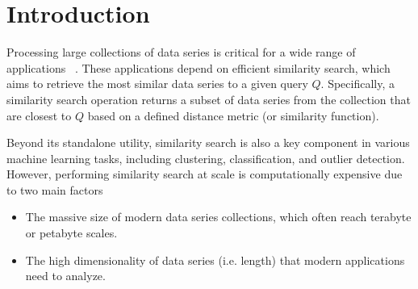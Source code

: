 \documentclass[a4paper,11pt,twoside,openany]{book}
\begin{document}
\chapter{Introduction}
\label{chapter:introduction}


Processing large collections of data series is critical for a wide range of applications
~\cite{DBLP:journals/sigmod/Palpanas15,DBLP:journals/dagstuhl-reports/BagnallCPZ19,Palpanas2019}.
These applications depend on efficient similarity search, which aims to retrieve the most similar
data series to a given query $Q$.
Specifically, a similarity search operation returns a subset of data series from the collection 
that are closest to $Q$  based on a defined distance metric (or similarity function).

Beyond its standalone utility, similarity search is also a key component in various machine 
learning tasks, including clustering, classification, and outlier detection. However, 
performing similarity search at scale is computationally expensive due to two main factors 
\begin{itemize}
\item The massive size of modern data series collections, which often reach terabyte or petabyte scales.
\item The high dimensionality of data series (i.e. length) that modern applications need to analyze.
\end{itemize}
\end{document}
